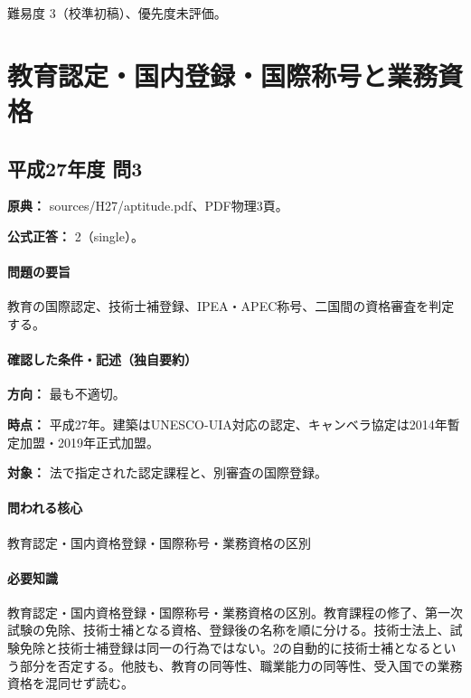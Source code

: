 \par 難易度 3（校準初稿）、優先度未評価。

\section{教育認定・国内登録・国際称号と業務資格}

\subsection{平成27年度 問3}
\label{q:h27-reg-apt-03}

\noindent\textbf{原典：} sources/H27/aptitude.pdf、PDF物理3頁。

\textbf{公式正答：} 2（single）。

\paragraph{問題の要旨} 教育の国際認定、技術士補登録、IPEA・APEC称号、二国間の資格審査を判定する。

\paragraph{確認した条件・記述（独自要約）}\mbox{}\par

\noindent\textbf{方向：} 最も不適切。\par

\noindent\textbf{時点：} 平成27年。建築はUNESCO-UIA対応の認定、キャンベラ協定は2014年暫定加盟・2019年正式加盟。\par

\noindent\textbf{対象：} 法で指定された認定課程と、別審査の国際登録。\par

\paragraph{問われる核心} 教育認定・国内資格登録・国際称号・業務資格の区別

\paragraph{必要知識} 教育認定・国内資格登録・国際称号・業務資格の区別。教育課程の修了、第一次試験の免除、技術士補となる資格、登録後の名称を順に分ける。技術士法上、試験免除と技術士補登録は同一の行為ではない。2の自動的に技術士補となるという部分を否定する。他肢も、教育の同等性、職業能力の同等性、受入国での業務資格を混同せず読む。

